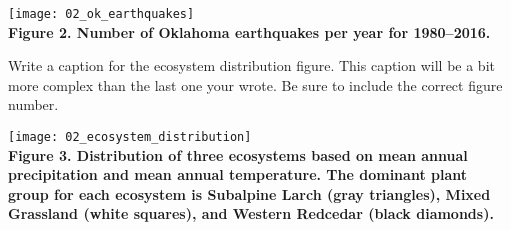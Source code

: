 \documentclass[12pt, hidelinks]{exam}
\begin{document}
\begin{questions}
\hfil%
\begin{minipage}{0.7\textwidth}
	\texttt{[image: 02\_ok\_earthquakes]}\\
	
	\ifprintanswers 
		\textbf{Figure 2. Number of Oklahoma earthquakes per year for 1980–2016.}
		\vspace*{\baselineskip}
	\else
		\vspace{0.1\textheight}
	\fi
	
\end{minipage}%
\hfil


\question
Write a caption for the ecosystem distribution figure. This
caption will be a bit more complex than the last one your wrote.
Be sure to include  the correct figure number.

\hfil%
\begin{minipage}{0.7\textwidth}
	\texttt{[image: 02\_ecosystem\_distribution]}\\
	
	\ifprintanswers 
		\textbf{{\small Figure 3. Distribution of three ecosystems based on mean annual precipitation and mean annual temperature. The dominant plant group for each ecosystem is Subalpine Larch (gray triangles), Mixed Grassland (white squares), and Western Redcedar (black diamonds).}}
	\else
		\vspace{0.01\textheight}
	\fi
	
	
\end{minipage}%
\hfil


\end{questions}
\end{document}

